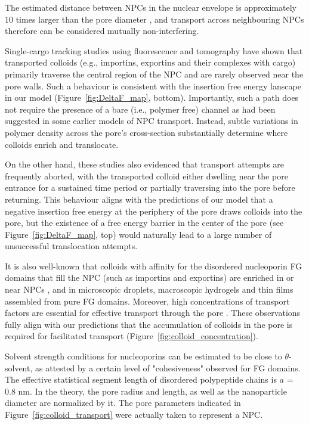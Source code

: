 \documentclass[12pt, a4paper]{article}
\begin{document}
The estimated distance between NPCs in the nuclear envelope is approximately 10 times larger than the pore diameter \cite{Yang2004, Daigle2001, Feldherr1984, Kubitscheck2000}, and transport across neighbouring NPCs therefore can be considered mutually non-interfering. 

Single-cargo tracking studies using fluorescence \cite{Musser2016, Lowe2010, Lowe2015, Yang2004, Kubitscheck2000, Ma2010} and tomography \cite{Beck2007} have shown that transported colloids (e.g., importins, exportins and their complexes with cargo) primarily traverse the central region of the NPC and are rarely observed near the pore walls.
Such a behaviour is consistent with the  insertion free energy lanscape in our model (Figure~\ref{fig:DeltaF_map}, bottom).
Importantly, such a path does not require the presence of a bare (i.e., polymer free) channel as had been suggested in some earlier models of NPC transport. Instead, subtle variations in polymer density across the pore's cross-section substantially determine where colloids enrich and translocate.  

On the other hand, these studies also evidenced that transport attempts are frequently aborted, with the transported colloid either dwelling near the pore entrance for a sustained time period or partially traversing into the pore before returning.
This behaviour aligns with the predictions of our model that a negative insertion free energy at the periphery of the pore draws colloids into the pore, but the existence of a free energy barrier in the center of the pore (see Figure~\ref{fig:DeltaF_map}, top) would naturally lead to a large number of unsuccessful translocation attempts.

It is also well-known that colloids with affinity for the disordered nucleoporin FG domains that fill the NPC (such as importins and exportins) are enriched in or near NPCs \cite{Beck2007, Gruenwald2010, Tu2011}, and in microscopic droplets, macroscopic hydrogels and thin films assembled from pure FG domains.
Moreover, high concentrations of transport factors are essential for effective transport through the pore \cite{Lowe2015}.
These observations fully align with our predictions that the accumulation of colloids in the pore is required for facilitated transport (Figure~\ref{fig:colloid_concentration}).

Solvent strength conditions for nucleoporins can be estimated to be close to $\theta$-solvent, as attested by a certain level of "cohesiveness" observed for FG domains. 
The effective statistical segment length of disordered polypeptide chains is $a$ = 0.8 nm. In the theory, the pore radius and length, as well as the nanoparticle diameter are normalized by it. The pore parameters indicated in Figure~\ref{fig:colloid_transport} were actually taken to represent a NPC.
\end{document}

